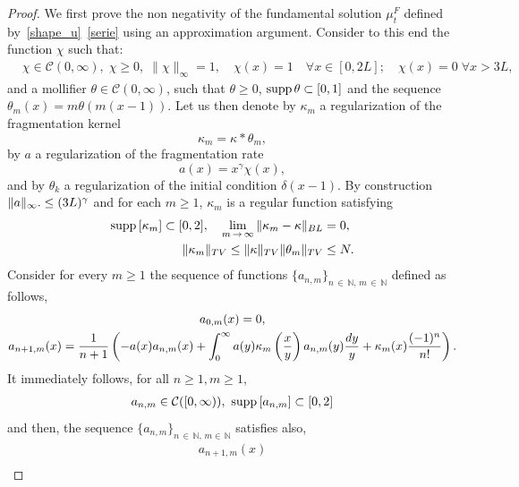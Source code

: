 \documentclass[10pt,a4paper]{amsart}
\numberwithin{equation}{section}
\newcommand*\dst{\displaystyle}
\newcommand*\N{\mathbb{N}}
\newcommand{\clC}{\mathcal{C}}
\newcommand{\MT}[1]{{\textcolor{black}{#1}}}
\newcommand*\supp{{\mbox{\small\rm supp}}\,}
\let\oldforall\forall
\renewcommand*{\forall}{\mathrel{\oldforall}}
\begin{document}
\begin{proof}
We first prove the non negativity of the fundamental solution $\mu_t^F$ defined by~\eqref{shape_u}~\eqref{serie} using an approximation argument. Consider to this end the function $\chi$ such that:
\begin{align*}
&\chi\in \clC(0, \infty),\;\chi\ge 0,\;\|\chi\|_\infty=1, \quad \chi(x)=1\quad\forall x\in [0, 2L];\quad
\chi(x)=0\;\forall x>3L,
\end{align*}
and a mollifier $\theta\in \clC(0, \infty)$, such that $\theta \ge 0$, $\supp \theta\subset [0, 1]$ and the sequence $\theta _m(x)=m\theta (m(x-1))$. Let us then denote by $\kappa_m$ a regularization of the fragmentation kernel
\begin{equation*}
\kappa _m=\kappa \ast \theta_m,
\end{equation*}
by $a$ a regularization of the fragmentation rate
\begin{equation*}
a(x)=x^{\gamma}\chi(x),
\end{equation*}
and by $\theta_k$ a regularization of the initial condition $\delta(x-1)$. By construction $\|a\|_\infty. \linebreak\le (3L)^\gamma$ and for each $m\ge 1$, $\kappa _m$ is a regular function satisfying
\begin{equation}
\label{kmBL2}
\begin{split}
\supp[\kappa_m]\subset [0, 2], \quad \lim_{m\,\to \,\infty}\|\kappa _m-\kappa\|_{BL} &=0, \\
\|\kappa _m\|_{TV}\le \|\MT{\kappa}\|_{TV}\|\theta_m\|_{TV} &\le N.
\end{split}
\end{equation}
Consider for every $m\ge 1$ the sequence of functions $\{a_{n, m}\}_{n\,\in\,\N,\,m\,\in\,\N}$ defined as follows,
\begin{multline}\label{inductionB}
 a_{0, m}(x) =0,\\
a_{n+1, m}(x) = \dfrac{1}{n+1}\left(-a(x)a_{n, m}(x)+ \dst\int_{\MT{0}}^{\infty} a(y) \kappa_m \left(\dfrac{x}{y} \right)a_{n, m}(y)\MT{\dfrac{dy}{y}} + \kappa_m(x) \dfrac{(-1)^n}{n!}\right).
\end{multline}
It immediately follows, for all $n\ge 1, m\ge 1$,
\begin{align*}
a_{n, m}\in \clC([0, \infty)),\,\,\supp[a_{n, m}]\subset[0, 2]
\end{align*}
and then, the sequence $\{a_{n, m}\}_{n\,\in\,\N,\,m\in\,\N}$ satisfies also,
\begin{multline}\label{inductionC}
a_{n+1, m}(x)\\

\end{multline}
\end{proof}
\end{document}

